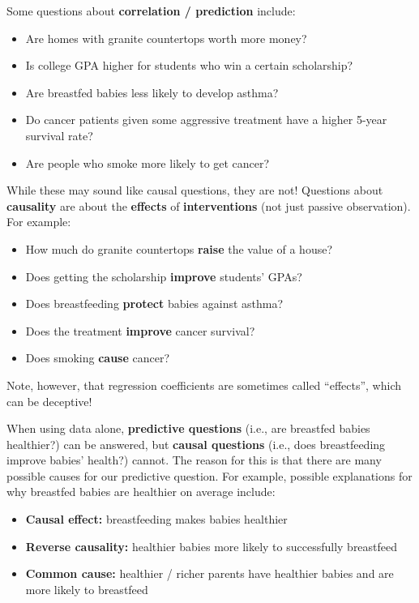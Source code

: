 \documentclass[
  letterpaper,
  DIV=11,
  numbers=noendperiod]{scrreprt}
\providecommand{\tightlist}{%
  \setlength{\itemsep}{0pt}\setlength{\parskip}{0pt}}\usepackage{longtable,booktabs,array}
\begin{document}
Some questions about \textbf{correlation / prediction} include:

\begin{itemize}
\tightlist
\item
  Are homes with granite countertops worth more money?
\item
  Is college GPA higher for students who win a certain scholarship?
\item
  Are breastfed babies less likely to develop asthma?
\item
  Do cancer patients given some aggressive treatment have a higher
  5-year survival rate?
\item
  Are people who smoke more likely to get cancer?
\end{itemize}

While these may sound like causal questions, they are not! Questions
about \textbf{causality} are about the \textbf{effects} of
\textbf{interventions} (not just passive observation). For example:

\begin{itemize}
\tightlist
\item
  How much do granite countertops \textbf{raise} the value of a house?
\item
  Does getting the scholarship \textbf{improve} students' GPAs?
\item
  Does breastfeeding \textbf{protect} babies against asthma?
\item
  Does the treatment \textbf{improve} cancer survival?
\item
  Does smoking \textbf{cause} cancer?
\end{itemize}

Note, however, that regression coefficients are sometimes called
``effects'', which can be deceptive!

When using data alone, \textbf{predictive questions} (i.e., are
breastfed babies healthier?) can be answered, but \textbf{causal
questions} (i.e., does breastfeeding improve babies' health?) cannot.
The reason for this is that there are many possible causes for our
predictive question. For example, possible explanations for why
breastfed babies are healthier on average include:

\begin{itemize}
\tightlist
\item
  \textbf{Causal effect:} breastfeeding makes babies healthier
\item
  \textbf{Reverse causality:} healthier babies more likely to
  successfully breastfeed
\item
  \textbf{Common cause:} healthier / richer parents have healthier
  babies and are more likely to breastfeed
\end{itemize}
\end{document}
